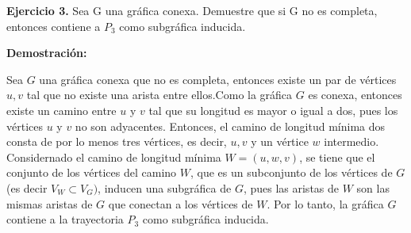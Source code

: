 \textbf{Ejercicio 3.} Sea G una gráfica conexa. Demuestre que si G no es completa, 
entonces contiene a $P_3$ como subgráfica inducida.

\textbf{Demostración:}

Sea $G$ una gráfica conexa que no es completa, entonces existe un par de vértices
$u,v$ tal que no existe una arista entre ellos.Como la gráfica $G$ es conexa, entonces 
existe un camino entre $u$ y $v$ tal que su longitud es mayor o igual a dos, pues los 
vértices $u$ y $v$ no son adyacentes. Entonces, el camino de longitud mínima dos consta 
de por lo menos tres vértices, es decir, $u,v$ y un vértice $w$ intermedio. Considernado 
el camino de longitud mínima $W = (u,w,v)$, se tiene que el conjunto de los vértices del 
camino $W$, que es un subconjunto de los vértices de $G$ (es decir $V_W \subset V_G)$, 
inducen una subgráfica de $G$,  pues las aristas de $W$ son las mismas aristas de $G$ 
que conectan a los vértices de $W$. Por lo tanto, la gráfica $G$ contiene a la trayectoria 
$P_3$ como subgráfica inducida.

\QED